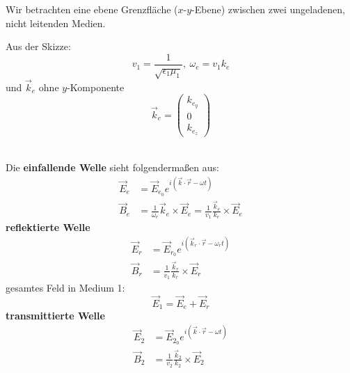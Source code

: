 Wir betrachten eine ebene Grenzfläche ($ x $-$ y $-Ebene) zwischen zwei ungeladenen, nicht leitenden Medien.\\
\begin{minipage}{.55\linewidth}
	Aus der Skizze:
	\begin{equation*}
	v_1 = \frac{1}{\sqrt{\epsilon_1 \mu_1}} , \ \omega_e = v_1 k_e
	\end{equation*}
	und $ \vec{k}_e $ ohne $ y $-Komponente
	\begin{equation*}
	\vec{k}_e = \begin{pmatrix}
	k_{e_y} \\ 0 \\ k_{e_z}
	\end{pmatrix}
	\end{equation*}
	\vspace{5pt}
\end{minipage}%
\begin{minipage}{.45\linewidth}
\end{minipage}%
\\
Die \textbf{einfallende Welle} sieht folgendermaßen aus:
\begin{align*}
\vec{E}_e &= \vec{E}_{e_0} e^{i(\vec{k} \cdot \vec{r} - \omega t)}\\
\vec{B}_e &= \frac{1}{\omega_e} \vec{k}_e \times \vec{E}_e = \frac{1}{v_1} \frac{\vec{k}_e}{k_e} \times \vec{E}_e
\end{align*}
\textbf{reflektierte Welle}
\begin{align*}
\vec{E}_r &= \vec{E}_{r_0} e^{i(\vec{k}_r \cdot \vec{r} - \omega_r t)} \\
\vec{B}_r &= \frac{1}{v_1} \frac{\vec{k}_r}{k_r} \times \vec{E}_r
\end{align*}
gesamtes Feld in Medium 1:
\begin{equation*}
\vec{E}_1 = \vec{E}_e + \vec{E}_r
\end{equation*}
\textbf{transmittierte Welle}
\begin{align*}
\vec{E}_2 &= \vec{E}_{2_0} e^{i(\vec{k} \cdot \vec{r} - \omega t)} \\
\vec{B}_2 &= \frac{1}{v_2} \frac{\vec{k}_2}{k_2} \times \vec{E}_2
\end{align*}

